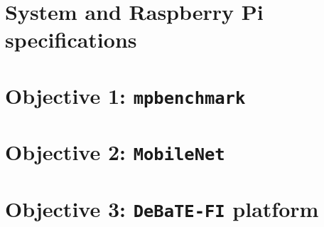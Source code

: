 \section{System and Raspberry Pi specifications}
\section{Objective 1: \texttt{mpbenchmark}}
\section{Objective 2: \texttt{MobileNet}}
\section{Objective 3: \texttt{DeBaTE-FI} platform}




